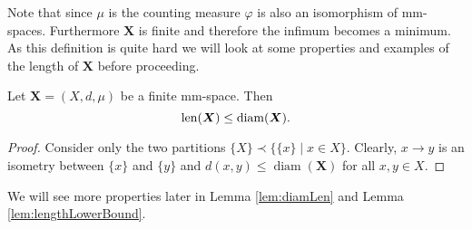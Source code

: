 Note that since $\mu$ is the counting measure $\varphi$ is also an isomorphism of mm-spaces. Furthermore $\boldsymbol{X}$ is finite and therefore the infimum becomes a minimum.
As this definition is quite hard we will look at some properties and examples of the length of $\boldsymbol{X}$ before proceeding.
\begin{lemma}\label{lem:lenUpperBound}
	Let $\boldsymbol{X}=(X,d,\mu)$ be a finite mm-space. Then 
	\[\operatorname{len}(\boldsymbol{X})\leq \operatorname{diam}(\boldsymbol{X}).\]
\end{lemma}
\begin{proof}
	Consider only the two partitions $\{X\}\prec\{\{x\}\mid x\in X\}$. Clearly,  $x\to y$ is an isometry between $\{x\}$ and $\{y\}$ and $d(x,y)\leq\operatorname{diam}(\boldsymbol{X})$ for all $x,y\in X$.
\end{proof}
		
We will see more properties later in Lemma \ref{lem:diamLen} and Lemma \ref{lem:lengthLowerBound}.
		
